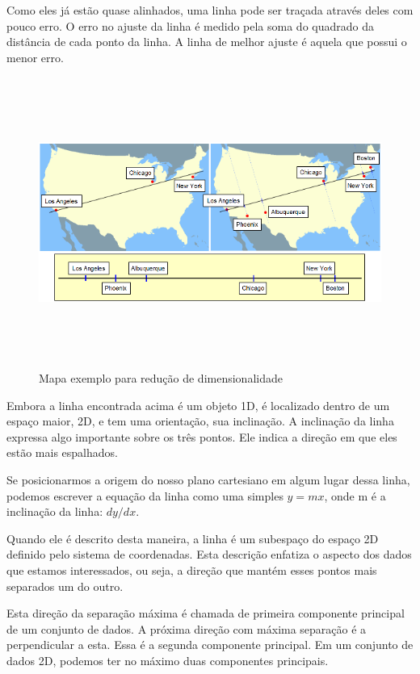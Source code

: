 Como eles já estão quase alinhados, uma linha pode ser traçada através deles com pouco erro. O erro no ajuste da linha é medido pela soma do quadrado da distância de cada ponto da linha. A linha de melhor ajuste é aquela que possui o menor erro.

	\begin{figure}[hbt]
		\begin{center}
			\includegraphics[height=9.5cm,width=12.5cm]{figuras/2.FundamentacaoTeorica/PCAexemploMapa.png}
		\end{center}
		\caption{Mapa exemplo para redução de dimensionalidade}
		\label{exemploPCA}
	\end{figure}

Embora a linha encontrada acima é um objeto 1D, é localizado dentro de um espaço maior, 2D, e tem uma orientação, sua inclinação. A inclinação da linha expressa algo importante sobre os três pontos. Ele indica a direção em que eles estão mais espalhados.


Se posicionarmos a origem do nosso plano cartesiano em algum lugar dessa linha, podemos escrever a equação da linha como uma simples $y = mx$, onde m é a inclinação da linha: $dy / dx$.

Quando ele é descrito desta maneira, a linha é um subespaço do espaço 2D definido pelo sistema de coordenadas. Esta descrição enfatiza o aspecto dos dados que estamos interessados, ou seja, a direção que mantém esses pontos mais separados um do outro.

Esta direção da separação máxima é chamada de primeira componente principal de um conjunto de dados. A próxima direção com máxima separação é a perpendicular a esta. Essa é a segunda componente principal. Em um conjunto de dados 2D, podemos ter no máximo duas componentes principais.


